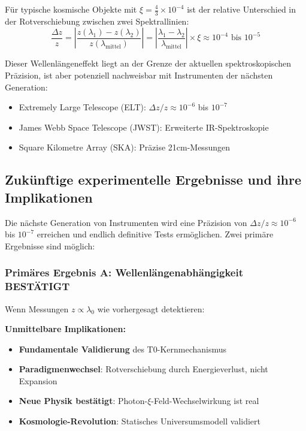 \documentclass[12pt,a4paper]{article}
\newcommand{\xiconst}{\xi = \frac{4}{3} \times 10^{-4}}
\theoremstyle{definition}
\begin{document}
	F\"ur typische kosmische Objekte mit $\xiconst$ ist der relative Unterschied in der Rotverschiebung zwischen zwei Spektrallinien:
	\begin{equation}
		\frac{\Delta z}{z} = \left| \frac{z(\lambda_1) - z(\lambda_2)}{z(\lambda_{\text{mittel}})} \right| = \left| \frac{\lambda_1 - \lambda_2}{\lambda_{\text{mittel}}} \right| \times \xi \approx 10^{-4} \text{ bis } 10^{-5}
	\end{equation}
	
	\begin{important}
		Dieser Wellenl\"angeneffekt liegt an der Grenze der aktuellen spektroskopischen Pr\"azision, ist aber potenziell nachweisbar mit Instrumenten der n\"achsten Generation:
		\begin{itemize}
			\item Extremely Large Telescope (ELT): $\Delta z/z \approx 10^{-6}$ bis $10^{-7}$
			\item James Webb Space Telescope (JWST): Erweiterte IR-Spektroskopie
			\item Square Kilometre Array (SKA): Pr\"azise 21cm-Messungen
		\end{itemize}
	\end{important}
	
	\subsection{Zuk\"unftige experimentelle Ergebnisse und ihre Implikationen}
	
	Die n\"achste Generation von Instrumenten wird eine Pr\"azision von $\Delta z/z \approx 10^{-6}$ bis $10^{-7}$ erreichen und endlich definitive Tests erm\"oglichen. Zwei prim\"are Ergebnisse sind m\"oglich:
	
	\subsubsection{Prim\"ares Ergebnis A: Wellenl\"angenabh\"angigkeit BEST\"ATIGT}
	\label{subsubsec:confirmed}
	
	Wenn Messungen $z \propto \lambda_0$ wie vorhergesagt detektieren:
	
	\textbf{Unmittelbare Implikationen:}
	\begin{itemize}
		\item \textbf{Fundamentale Validierung} des T0-Kernmechanismus
		\item \textbf{Paradigmenwechsel}: Rotverschiebung durch Energieverlust, nicht Expansion
		\item \textbf{Neue Physik best\"atigt}: Photon-$\xi$-Feld-Wechselwirkung ist real
		\item \textbf{Kosmologie-Revolution}: Statisches Universumsmodell validiert
	\end{itemize}
	
\end{document}
